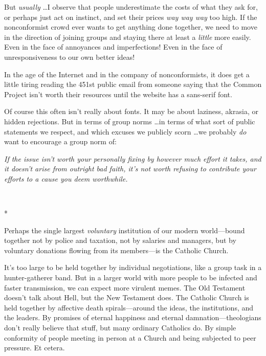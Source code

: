 {
 But \textit{usually} \ldots I observe that people underestimate the
costs of what they ask for, or perhaps just act on instinct, and set
their prices \textit{way way way} too high. If the nonconformist crowd
ever wants to get anything done together, we need to move in the
direction of joining groups and staying there at least a
\textit{little} more easily. Even in the face of annoyances and
imperfections! Even in the face of unresponsiveness to our own better
ideas!}

{
 In the age of the Internet and in the company of nonconformists,
it does get a little tiring reading the 451st public email from someone
saying that the Common Project isn't worth their
resources until the website has a sans-serif font.}

{
 Of course this often isn't really about fonts. It
may be about laziness, akrasia, or hidden rejections. But in terms of
group norms \ldots in terms of what sort of public statements we
respect, and which excuses we publicly scorn \ldots we probably
\textit{do} want to encourage a group norm of:}

{
 \textit{If the issue isn't worth your personally
fixing by however much effort it takes, and it doesn't
arise from outright bad faith, it's not worth refusing
to contribute your efforts to a cause you deem worthwhile.}}

{\centering
 \ ~
\par}

{\centering
 *
\par}


{
 Perhaps the single largest \textit{voluntary} institution of our
modern world---bound together not by police and taxation, not by
salaries and managers, but by voluntary donations flowing from its
members---is the Catholic Church. }

{
 It's too large to be held together by individual
negotiations, like a group task in a hunter-gatherer band. But in a
larger world with more people to be infected and faster transmission,
we can expect more virulent memes. The Old Testament
doesn't talk about Hell, but the New Testament does.
The Catholic Church is held together by affective death
spirals---around the ideas, the institutions, and the leaders. By
promises of eternal happiness and eternal damnation---theologians
don't really believe that stuff, but many ordinary
Catholics do. By simple conformity of people meeting in person at a
Church and being subjected to peer pressure. Et cetera.}

